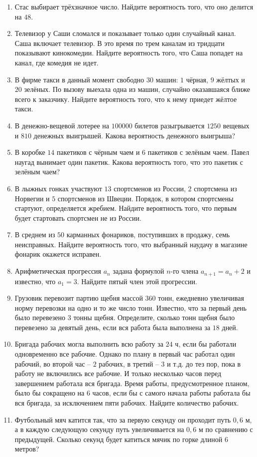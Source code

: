 \documentclass[12pt, a4paper]{article}
\begin{document}
	
	\begin{enumerate}
		\item Стас выбирает трёхзначное число. Найдите вероятность того, что оно делится на $48$.
		\item Телевизор у Саши сломался и показывает только один случайный канал. Саша включает телевизор. В это время по трем каналам из тридцати показывают кинокомедии. Найдите вероятность того, что Саша попадет на канал, где комедия не идет.
		\item В фирме такси в данный момент свободно $30$ машин: $1$ чёрная, $9$ жёлтых и $20$ зелёных. По вызову выехала одна из машин, случайно оказавшаяся ближе всего к заказчику. Найдите вероятность того, что к нему приедет жёлтое такси.
		\item В денежно-вещевой лотерее на $100000$ билетов разыгрывается $1250$ вещевых и $810$ денежных выигрышей. Какова вероятность денежного выигрыша?
		\item В коробке $14$ пакетиков с чёрным чаем и $6$ пакетиков с зелёным чаем. Павел наугад вынимает один пакетик. Какова вероятность того, что это пакетик с зелёным чаем?
		\item В лыжных гонках участвуют $13$ спортсменов из России, $2$ спортсмена из Норвегии и $5$ спортсменов из Швеции. Порядок, в котором спортсмены стартуют, определяется жребием. Найдите вероятность того, что первым будет стартовать спортсмен не из России.
		\item В среднем из $50$ карманных фонариков, поступивших в продажу, семь неисправных. Найдите вероятность того, что выбранный наудачу в магазине фонарик окажется исправен.
		\item Арифметическая прогрессия $a_n$ задана формулой $n$-го члена $a_{n+1}=a_n+2$  и известно, что $a_1=3$. Найдите пятый член этой прогрессии.
		\item Грузовик перевозит партию щебня массой $360$ тонн, ежедневно увеличивая норму перевозки на одно и то же число тонн. Известно, что за первый день было перевезено $3$ тонны щебня. Определите, сколько тонн щебня было перевезено за девятый день, если вся работа была выполнена за $18$ дней.
		\item Бригада рабочих могла выполнить всю работу за $24$ ч, если бы работали одновременно все рабочие. Однако по плану в первый час работал один рабочий, во второй час – $2$ рабочих, в третий – $3$ и т.д. до тез пор, пока в работу не включились все рабочие. И только несколько часов перед завершением работала вся бригада. Время работы, предусмотренное планом, было бы сокращено на 6 часов, если бы с самого начала работы работала бы вся бригада, за исключением пяти рабочих. Найдите количество рабочих.
		\item Футбольный мяч катится так, что за первую секунду он проходит путь $0,6$ м, а в каждую следующую секунду путь увеличивается на $0,6$ м по сравнению с предыдущей. Сколько секунд будет катиться мячик по горке длиной $6$ метров?
	\end{enumerate}
\end{document}
